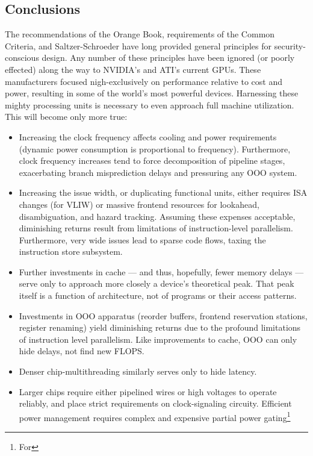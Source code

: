 \documentclass[letterpaper,10pt]{article}
\begin{document}
\begin{multicols}{2}
\section{Conclusions} 
The recommendations of the Orange Book\cite{orangebook}, requirements of the Common Criteria\cite{ccrit},
and Saltzer-Schroeder\cite{principles} have long provided general principles for
security-conscious design. Any number of these principles have been ignored
(or poorly effected) along the way to NVIDIA's and ATI's current GPUs. These
manufacturers focused nigh-exclusively on performance relative to cost and
power, resulting in some of the world's most powerful devices. Harnessing these
mighty processing units is necessary to even approach full machine utilization.
This will become only more true:
\begin{itemize}
\item Increasing the clock frequency affects cooling and power requirements
(dynamic power consumption is proportional to frequency). Furthermore,
clock frequency increases tend to force decomposition of pipeline
stages, exacerbating branch misprediction delays and pressuring any OOO
system\cite{cormean}.
\item Increasing the issue width, or duplicating functional units, either
requires ISA changes (for VLIW) or massive frontend resources for lookahead,
disambiguation, and hazard tracking. Assuming these expenses acceptable,
diminishing returns result from limitations of instruction-level parallelism.
Furthermore, very wide issues lead to sparse code flows, taxing the instruction
store subsystem. 
\item Further investments in cache --- and thus, hopefully, fewer memory
delays --- serve only to approach more closely a device's theoretical peak.
That peak itself is a function of architecture, not of programs or their
access patterns.
\item Investments in OOO apparatus (reorder buffers,
frontend reservation stations, register renaming) yield diminishing returns due
to the profound limitations of instruction level parallelism\cite{phenn}. Like improvements
to cache, OOO can only hide delays, not find new FLOPS\@.
\item Denser chip-multithreading similarly serves only to hide latency.
\item Larger chips require either pipelined wires or high voltages to operate
reliably, and place strict requirements on clock-signaling circuity. Efficient
power management requires complex and expensive partial power gating\footnote{For
}
\end{itemize}
\end{multicols}
\end{document}

